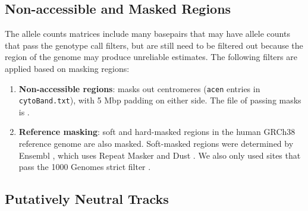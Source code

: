 \documentclass[11pt]{article}
\begin{document}
\subsection{Non-accessible and Masked Regions}
\label{supp:accessible}

The allele counts matrices include many basepairs that may have allele counts
that pass the genotype call filters, but are still need to be filtered out
because the region of the genome may produce unreliable estimates. The
following filters are applied based on masking regions:

\begin{enumerate}

  \item \textbf{Non-accessible regions}: masks out centromeres (\texttt{acen} entries in
    \texttt{cytoBand.txt}), with 5 Mbp padding on either side. The file of
    passing masks is . 

  \item \textbf{Reference masking}: soft and hard-masked regions in the human
      GRCh38 reference genome are also masked. Soft-masked regions were
      determined by Ensembl \parencite{Cunningham2022-vk}, which uses Repeat
      Masker \parencite{Smit2015-nm} and Dust \parencite{Morgulis2006-uo}. We
      also only used sites that pass the 1000 Genomes strict filter
      \parencite{1000_Genomes_Project_Consortium2015-mi}.

\end{enumerate}

\subsection{Putatively Neutral Tracks}
\label{supp:neutral}
\end{document}
